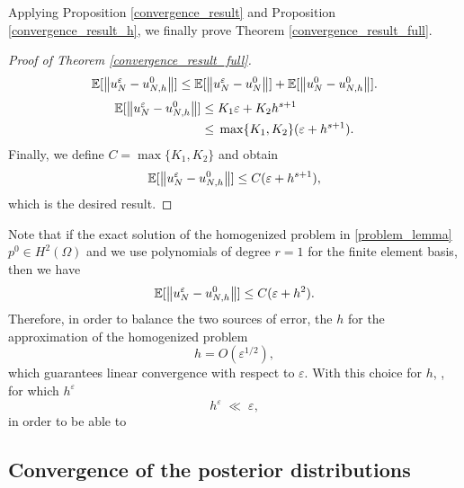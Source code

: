\documentclass[10pt]{article}
\begin{document}
Applying Proposition \ref{convergence_result} and Proposition \ref{convergence_result_h}, we finally prove Theorem \ref{convergence_result_full}.
\begin{proof}[Proof of Theorem \ref{convergence_result_full}]
\[ \mathbb{E}[ \left\|u_N^{\varepsilon} - u_{N,h}^0\right\| ] \le \mathbb{E} [ \left\|u_N^{\varepsilon} - u_N^0\right\| ] + \mathbb{E} [ \left\|u_N^0 - u_{N,h}^0\right\| ]. \]
\begin{align*}
\mathbb{E}[ \left\|u_N^{\varepsilon} - u_{N,h}^0\right\| ] \le & \; K_1 \varepsilon + K_2 h^{s+1} \\
\le & \; \max \{ K_1, K_2 \} (\varepsilon + h^{s+1}).
\end{align*}
Finally, we define $C = \max \{ K_1, K_2 \}$ and obtain
\begin{equation*}
\mathbb{E}[ \left\|u_N^{\varepsilon} - u_{N,h}^0\right\| ] \le C (\varepsilon + h^{s+1}),
\end{equation*}
which is the desired result.
\end{proof}

\begin{remark}
Note that if the exact solution of the homogenized problem in \eqref{problem_lemma} $p^0 \in H^{2}(\Omega)$ and we use polynomials of degree $r = 1$ for the finite element basis, then we have
\begin{equation*}
\mathbb{E}[ \left\|u_N^{\varepsilon} - u_{N,h}^0\right\| ] \le C (\varepsilon + h^2).
\end{equation*}
Therefore, in order to balance the two sources of error, the  $h$ for the  approximation of the homogenized problem 
\begin{equation}
\label{heremark}
h = O( \varepsilon^{1/2} ),
\end{equation}
which guarantees linear convergence with respect to $\varepsilon$. With this choice for $h$, , for which $h^{\varepsilon}$ 
\[ h^{\varepsilon} \; \ll \; \varepsilon, \]
in order to be able to 
\end{remark}

\subsection{Convergence of the posterior distributions}
\end{document}
